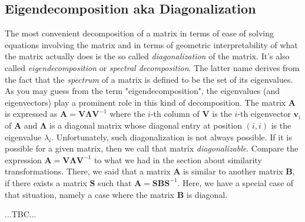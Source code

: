 
\subsection{Eigendecomposition aka Diagonalization}
The most convenient decomposition of a matrix in terms of ease of solving equations involving the matrix and in terms of geometric interpretability of what the matrix actually does is the so called \emph{diagonalization} of the matrix. It's also called \emph{eigendecomposition} or \emph{spectral decomposition}. The latter name derives from the fact that the \emph{spectrum} of a matrix is defined to be the set of its eigenvalues. As you may guess from the term "eigendecomposition", the eigenvalues (and eigenvectors) play a prominent role in this kind of decomposition. The matrix $\mathbf{A}$ is expressed as $\mathbf{A} = \mathbf{V} \mathbf{\Lambda} \mathbf{V}^{-1}$ where the $i$-th column of $\mathbf{V}$ is the $i$-th eigenvector $\mathbf{v}_i$ of $\mathbf{A}$ and $\mathbf{\Lambda}$ is a diagonal matrix whose diagonal entry at position $(i,i)$ is the eigenvalue $\lambda_i$. Unfortunately, such diagonalization is not always possible. If it is possible for a given matrix, then we call that matrix \emph{diagonalizable}. Compare the expression $\mathbf{A} = \mathbf{V} \mathbf{\Lambda} \mathbf{V}^{-1}$ to what we had in the section about similarity transformations. There, we said that a matrix $\mathbf{A}$ is similar to another matrix $\mathbf{B}$, if there exists a matrix $\mathbf{S}$ such that $\mathbf{A} = \mathbf{S} \mathbf{B} \mathbf{S}^{-1}$. Here, we have a special case of that situation, namely a case where the matrix $\mathbf{B}$ is diagonal.



...TBC...





